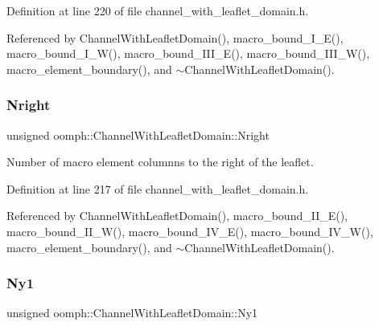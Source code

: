 Definition at line 220 of file channel\+\_\+with\+\_\+leaflet\+\_\+domain.\+h.



Referenced by Channel\+With\+Leaflet\+Domain(), macro\+\_\+bound\+\_\+\+I\+\_\+\+E(), macro\+\_\+bound\+\_\+\+I\+\_\+\+W(), macro\+\_\+bound\+\_\+\+I\+I\+I\+\_\+\+E(), macro\+\_\+bound\+\_\+\+I\+I\+I\+\_\+\+W(), macro\+\_\+element\+\_\+boundary(), and $\sim$\+Channel\+With\+Leaflet\+Domain().

\mbox{\label{classoomph_1_1ChannelWithLeafletDomain_a11aac62965f9bcb7d4c0043669b28f15}} 
\subsubsection{\texorpdfstring{Nright}{Nright}}
{\footnotesize\ttfamily unsigned oomph\+::\+Channel\+With\+Leaflet\+Domain\+::\+Nright\hspace{0.3cm}{\ttfamily [protected]}}



Number of macro element columnns to the right of the leaflet. 



Definition at line 217 of file channel\+\_\+with\+\_\+leaflet\+\_\+domain.\+h.



Referenced by Channel\+With\+Leaflet\+Domain(), macro\+\_\+bound\+\_\+\+I\+I\+\_\+\+E(), macro\+\_\+bound\+\_\+\+I\+I\+\_\+\+W(), macro\+\_\+bound\+\_\+\+I\+V\+\_\+\+E(), macro\+\_\+bound\+\_\+\+I\+V\+\_\+\+W(), macro\+\_\+element\+\_\+boundary(), and $\sim$\+Channel\+With\+Leaflet\+Domain().

\mbox{\label{classoomph_1_1ChannelWithLeafletDomain_a3c6393ef6e626d7a2f2a8ea70c8addbe}} 
\subsubsection{\texorpdfstring{Ny1}{Ny1}}
{\footnotesize\ttfamily unsigned oomph\+::\+Channel\+With\+Leaflet\+Domain\+::\+Ny1\hspace{0.3cm}{\ttfamily [protected]}}



